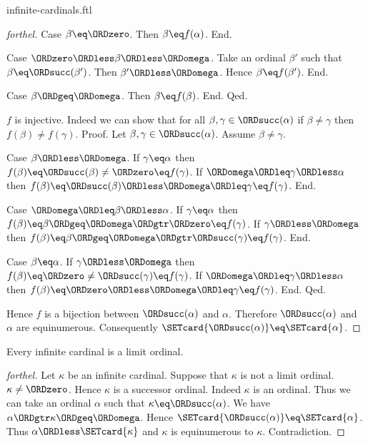 \documentclass{naproche-library}
\begin{document}
\begin{smodule}[title=Infinite Cardinal Numbers]{infinite-cardinals.ftl}
\begin{proof}[forthel]
    Case $\beta \eq \ORDzero$.
      Then $\beta \eq f(\alpha)$.
    End.

    Case $\ORDzero \ORDless \beta \ORDless \ORDomega$.
      Take an ordinal $\beta'$ such that $\beta \eq \ORDsucc(\beta')$.
      Then $\beta' \ORDless \ORDomega$.
      Hence $\beta \eq f(\beta')$.
    End.

    Case $\beta \ORDgeq \ORDomega$.
      Then $\beta \eq f(\beta)$.
    End.
  Qed.

  $f$ is injective.
  Indeed we can show that for all $\beta, \gamma \in \ORDsucc(\alpha)$ if
  $\beta \neq \gamma$ then $f(\beta) \neq f(\gamma)$. \newline
  Proof.
    Let $\beta, \gamma \in \ORDsucc(\alpha)$.
    Assume $\beta \neq \gamma$.

    Case $\beta \ORDless \ORDomega$.
      If $\gamma \eq \alpha$ then
      $f(\beta)
        \eq \ORDsucc(\beta)
        \neq \ORDzero
        \eq f(\gamma)$.
      If $\ORDomega \ORDleq \gamma \ORDless \alpha$ then
      $f(\beta)
        \eq \ORDsucc(\beta)
        \ORDless \ORDomega
        \ORDleq \gamma
        \eq f(\gamma)$.
    End.

    Case $\ORDomega \ORDleq \beta \ORDless \alpha$.
      If $\gamma \eq \alpha$ then
      $f(\beta)
        \eq \beta
        \ORDgeq \ORDomega
        \ORDgtr \ORDzero
        \eq f(\gamma)$.
      If $\gamma \ORDless \ORDomega$ then
      $f(\beta)
        \eq \beta
        \ORDgeq \ORDomega
        \ORDgtr \ORDsucc(\gamma)
        \eq f(\gamma)$.
    End.

    Case $\beta \eq \alpha$.
      If $\gamma \ORDless \ORDomega$ then
      $f(\beta)
        \eq \ORDzero
        \neq \ORDsucc(\gamma)
        \eq f(\gamma)$.
      If $\ORDomega \ORDleq \gamma \ORDless \alpha$ then
      $f(\beta)
        \eq \ORDzero
        \ORDless \ORDomega
        \ORDleq \gamma
        \eq f(\gamma)$.
    End.
  Qed.

  Hence $f$ is a bijection between $\ORDsucc(\alpha)$ and $\alpha$.
  Therefore $\ORDsucc(\alpha)$ and $\alpha$ are equinumerous.
  Consequently $\SETcard{\ORDsucc(\alpha)} \eq \SETcard{\alpha}$.
\end{proof}

\begin{proposition}[forthel,id=SET_THEORY_07_8700732632989696]
  Every infinite cardinal is a limit ordinal.
\end{proposition}
\begin{proof}[forthel]
  Let $\kappa$ be an infinite cardinal.
  Suppose that $\kappa$ is not a limit ordinal.
  $\kappa \neq \ORDzero$.
  Hence $\kappa$ is a successor ordinal.
  Indeed $\kappa$ is an ordinal.
  Thus we can take an ordinal $\alpha$ such that $\kappa \eq \ORDsucc(\alpha)$.
  We have $\alpha \ORDgtr \kappa \ORDgeq \ORDomega$.
  Hence $\SETcard{\ORDsucc(\alpha)} \eq \SETcard{\alpha}$.
  Thus $\alpha \ORDless \SETcard{\kappa}$ and $\kappa$ is equinumerous to $\kappa$.
  Contradiction.
\end{proof}
\end{smodule}
\end{document}
